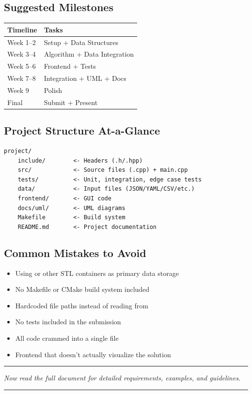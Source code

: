 \subsection*{Suggested Milestones}

\begin{center}
\begin{tabular}{l l}
\hline
\rowcolor{tableheader} \textbf{Timeline} & \textbf{Tasks} \\
\hline
Week 1--2 & Setup + Data Structures \\
Week 3--4 & Algorithm + Data Integration \\
Week 5--6 & Frontend + Tests \\
Week 7--8 & Integration + UML + Docs \\
Week 9 & Polish \\
Final & Submit + Present \\
\hline
\end{tabular}
\end{center}

\subsection*{Project Structure At-a-Glance}

\begin{lstlisting}[style=tree]
project/
    include/        <- Headers (.h/.hpp)
    src/            <- Source files (.cpp) + main.cpp
    tests/          <- Unit, integration, edge case tests
    data/           <- Input files (JSON/YAML/CSV/etc.)
    frontend/       <- GUI code
    docs/uml/       <- UML diagrams
    Makefile        <- Build system
    README.md       <- Project documentation
\end{lstlisting}

\subsection*{Common Mistakes to Avoid}

\begin{itemize}
  \item Using \stdvec{} or other STL containers as primary data storage
  \item No Makefile or CMake build system included
  \item Hardcoded file paths instead of reading from 
  \item No tests included in the submission
  \item All code crammed into a single file
  \item Frontend that doesn't actually visualize the solution
\end{itemize}

\noindent\rule{\textwidth}{0.4pt}
\begin{center}
\textit{Now read the full document for detailed requirements, examples, and guidelines.}
\end{center}
\noindent\rule{\textwidth}{0.4pt}
